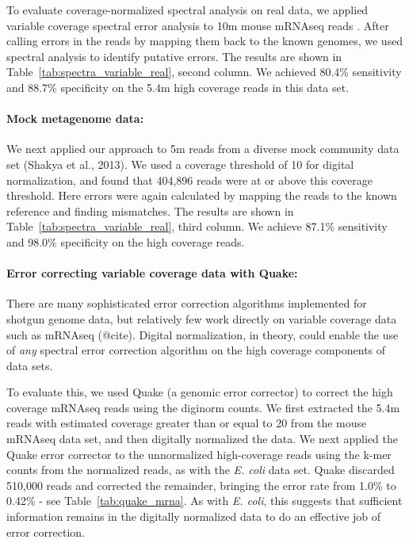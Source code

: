 \documentclass{article}
\begin{document}
To evaluate coverage-normalized spectral analysis on real data, we
applied variable coverage spectral error analysis to 10m mouse mRNAseq
reads \cite{Haas2013}.  After calling errors in the reads by mapping
them back to the known genomes, we used spectral analysis to identify
putative errors.  The results are shown in
Table~\ref{tab:spectra_variable_real}, second column.  We achieved
80.4\% sensitivity and 88.7\% specificity on the 5.4m high coverage
reads in this data set.

\paragraph{Mock metagenome data:}


We next applied our approach to 5m reads from a diverse mock community
data set (Shakya et al., 2013). We used a coverage threshold of 10 for
digital normalization, and found that 404,896 reads were at or above
this coverage threshold.  Here errors were again calculated by mapping
the reads to the known reference and finding mismatches.  The results
are shown in Table~\ref{tab:spectra_variable_real}, third column.  We
achieve 87.1\% sensitivity and 98.0\% specificity on the high coverage
reads.

\paragraph{Error correcting variable coverage data with Quake:}


There are many sophisticated error correction algorithms implemented
for shotgun genome data, but relatively few work directly on variable
coverage data such as mRNAseq (@cite).  Digital normalization, in theory,
could enable the use of {\em any} spectral error correction algorithm on the
high coverage components of data sets.

To evaluate this, we used Quake (a genomic error corrector) to correct
the high coverage mRNAseq reads using the diginorm counts.  We first
extracted the 5.4m reads with estimated coverage greater than or equal
to 20 from the mouse mRNAseq data set, and then digitally normalized
the data.  We next applied the Quake error corrector to the
unnormalized high-coverage reads using the k-mer counts from the
normalized reads, as with the {\em E. coli} data set.  Quake discarded
510,000 reads and corrected the remainder, bringing the error rate
from 1.0\% to 0.42\% - see Table~\ref{tab:quake_mrna}.  As with {\em
  E. coli}, this suggests that sufficient information remains in the
digitally normalized data to do an effective job of error correction.
\end{document}
